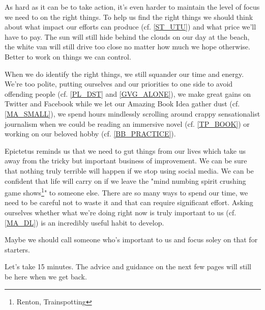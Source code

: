 \cleardoublepage
\begin{multicols}{2}

As hard as it can be to take action, it's even harder to maintain the level of focus we need to on the right things. To help us find the right things we should think about what impact our efforts can produce (cf. \ref{ST_UTU}) and what price we'll have to pay. The sun will still hide behind the clouds on our day at the beach, the white van will still drive too close no matter how much we hope otherwise. Better to work on things we can control.  %

When we do identify the right things, we still squander our time and energy. We're too polite, putting ourselves and our priorities to one side to avoid offending people (cf. \ref{PL_DST} and \ref{GVG_ALONE}), we make great gains on Twitter and Facebook while we let our Amazing Book Idea gather dust (cf. \ref{MA_SMALL}), we spend hours mindlessly scrolling around crappy sensationalist journalism when we could be reading an immersive novel (cf. \ref{TP_BOOK}) or working on our beloved hobby (cf. \ref{BB_PRACTICE}). 

Epictetus reminds us that we need to gut things from our lives which take us away from the tricky but important business of improvement. We can be sure that nothing truly terrible will happen if we stop using social media. We can be confident that life will carry on if we leave the "mind numbing spirit crushing game shows\footnote{Renton, Trainspotting}" to someone else. There are so many ways to spend our time, we need to be careful not to waste it and that can require significant effort. Asking ourselves whether what we're doing right now is truly important to us (cf. \ref{MA_DL}) is an incredibly useful habit to develop.

Maybe we should call someone who's important to us and focus soley on that for starters. 

Let's take 15 minutes. The advice and guidance on the next few pages will still be here when we get back. 

\end{multicols}
\clearpage
